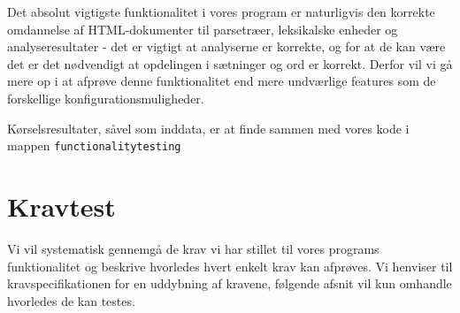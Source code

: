 \documentclass[a4paper,oneside,article]{memoir}
\begin{document}
Det absolut vigtigste funktionalitet i vores program er naturligvis
den korrekte omdannelse af HTML-dokumenter til parsetræer, leksikalske
enheder og analyseresultater - det er vigtigt at analyserne er
korrekte, og for at de kan være det er det nødvendigt at opdelingen i
sætninger og ord er korrekt. Derfor vil vi gå mere op i at afprøve
denne funktionalitet end mere undværlige features som de forskellige
konfigurationsmuligheder.

Kørselsresultater, såvel som inddata, er at finde sammen med vores
kode i mappen \texttt{functionalitytesting}

\chapter{Kravtest}

Vi vil systematisk gennemgå de krav vi har stillet til vores programs
funktionalitet og beskrive hvorledes hvert enkelt krav kan
afprøves. Vi henviser til kravspecifikationen for en uddybning af
kravene, følgende afsnit vil kun omhandle hvorledes de kan testes.
\end{document}
